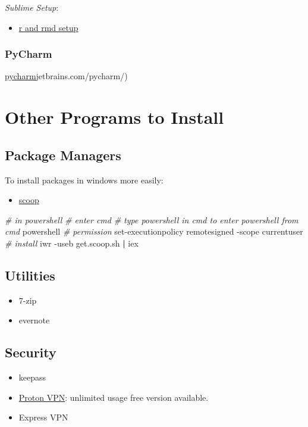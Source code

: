 \documentclass[]{article}
\newenvironment{Shaded}{\begin{snugshade}}{\end{snugshade}}
\newcommand{\CommentTok}[1]{\textcolor[rgb]{0.56,0.35,0.01}{\textit{#1}}}
\newcommand{\ExtensionTok}[1]{#1}
\newcommand{\KeywordTok}[1]{\textcolor[rgb]{0.13,0.29,0.53}{\textbf{#1}}}
\newcommand{\NormalTok}[1]{#1}
\providecommand{\tightlist}{%
  \setlength{\itemsep}{0pt}\setlength{\parskip}{0pt}}
\begin{document}
\emph{Sublime Setup}:

\begin{itemize}
\tightlist
\item
  \href{https://weibeld.net/r/rmd_sublime_package.html}{r and rmd setup}
\end{itemize}

\hypertarget{pycharm}{%
\subsubsection{PyCharm}\label{pycharm}}

\href{https://www.}{pycharm}jetbrains.com/pycharm/)

\hypertarget{other-programs-to-install}{%
\section{Other Programs to Install}\label{other-programs-to-install}}

\hypertarget{package-managers}{%
\subsection{Package Managers}\label{package-managers}}

To install packages in windows more easily:

\begin{itemize}
\tightlist
\item
  \href{https://github.com/lukesampson/scoop/wiki/Quick-Start}{scoop}
\end{itemize}

\begin{Shaded}
\begin{Highlighting}[]
\CommentTok{# in powershell}
\CommentTok{# enter cmd}
\CommentTok{# type powershell in cmd to enter powershell from cmd}
\ExtensionTok{powershell}
\CommentTok{# permission}
\ExtensionTok{set-executionpolicy}\NormalTok{ remotesigned -scope currentuser}
\CommentTok{# install}
\ExtensionTok{iwr}\NormalTok{ -useb get.scoop.sh }\KeywordTok{|} \ExtensionTok{iex}
\end{Highlighting}
\end{Shaded}

\hypertarget{utilities}{%
\subsection{Utilities}\label{utilities}}

\begin{itemize}
\tightlist
\item
  7-zip
\item
  evernote
\end{itemize}

\hypertarget{security}{%
\subsection{Security}\label{security}}

\begin{itemize}
\tightlist
\item
  keepass
\item
  \href{https://protonvpn.com/}{Proton VPN}: unlimited usage free
  version available.
\item
  Express VPN
\end{itemize}
\end{document}
